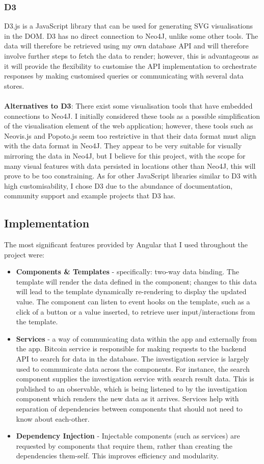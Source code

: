 \subsubsection{D3}
D3.js is a JavaScript library that can be used for generating SVG visualisations in the DOM. D3 has no direct connection to Neo4J, unlike some other tools. The data will therefore be retrieved using my own database API and will therefore involve further steps to fetch the data to render; however, this is advantageous as it will provide the flexibility to customise the API implementation to orchestrate responses by making customised queries or communicating with several data stores.
\\\\
\textbf{Alternatives to D3}: There exist some visualisation tools that have embedded connections to Neo4J. I initially considered these tools as a possible simplification of the visualisation element of the web application; however, these tools such as Neovis.js and Popoto.js seem too restrictive in that their data format must align with the data format in Neo4J. They appear to be very suitable for visually mirroring the data in Neo4J, but I believe for this project, with the scope for many visual features with data persisted in locations other than Neo4J, this will prove to be too constraining. As for other JavaScript libraries similar to D3 with high customisability, I chose D3 due to the abundance of documentation, community support and example projects that D3 has. 

\subsection{Implementation}
The most significant features provided by Angular that I used throughout the project were:
\begin{itemize}
    \item \textbf{Components \& Templates} - specifically: two-way data binding. The template will render the data defined in the component; changes to this data will lead to the template dynamically re-rendering to display the updated value. The component can listen to event hooks on the template, such as a click of a button or a value inserted, to retrieve user input/interactions from the template.
    \item \textbf{Services} - a way of communicating data within the app and externally from the app. Bitcoin service is responsible for making requests to the backend API to search for data in the database. The investigation service is largely used to communicate data across the components. For instance, the search component supplies the investigation service with search result data. This is published to an observable, which is being listened to by the investigation component which renders the new data as it arrives. Services help with separation of dependencies between components that should not need to know about each-other. 
    \item \textbf{Dependency Injection} - Injectable components (such as services) are requested by components that require them, rather than creating the dependencies them-self. This improves efficiency and modularity. 
\end{itemize}

